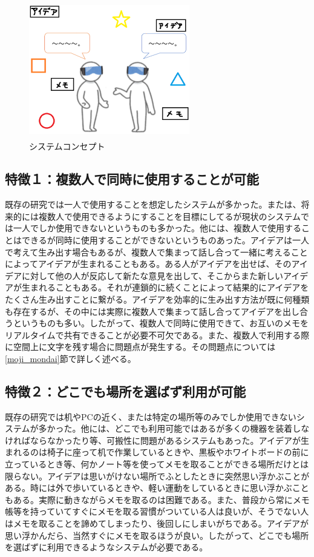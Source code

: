 \documentclass[technicalreport]{ieicej}
\begin{document}
\begin{figure}[h]
  \begin{center}
    \includegraphics[clip,height=6.0cm,width=7.0cm]{./concept.eps}
    \caption{システムコンセプト}
    \label{fig:concept}
  \end{center}
\end{figure}

\subsection*{特徴１：複数人で同時に使用することが可能}
既存の研究では一人で使用することを想定したシステムが多かった。または、将来的には複数人で使用できるようにすることを目標にしてるが現状のシステムでは一人でしか使用できないというものも多かった。他には、複数人で使用することはできるが同時に使用することができないというものあった。アイデアは一人で考えて生み出す場合もあるが、複数人で集まって話し合って一緒に考えることによってアイデアが生まれることもある。ある人がアイデアを出せば、そのアイデアに対して他の人が反応して新たな意見を出して、そこからまた新しいアイデアが生まれることもある。それが連鎖的に続くことによって結果的にアイデアをたくさん生み出すことに繋がる。アイデアを効率的に生み出す方法が既に何種類も存在するが、その中には実際に複数人で集まって話し合ってアイデアを出し合うというものも多い。したがって、複数人で同時に使用できて、お互いのメモをリアルタイムで共有できることが必要不可欠である。また、複数人で利用する際に空間上に文字を残す場合に問題点が発生する。その問題点については\ref{moji_mondai}節で詳しく述べる。

\subsection*{特徴２：どこでも場所を選ばず利用が可能}
既存の研究では机やPCの近く、または特定の場所等のみでしか使用できないシステムが多かった。他には、どこでも利用可能ではあるが多くの機器を装着しなければならなかったり等、可搬性に問題があるシステムもあった。アイデアが生まれるのは椅子に座って机で作業しているときや、黒板やホワイトボードの前に立っているとき等、何かノート等を使ってメモを取ることができる場所だけとは限らない。アイデアは思いがけない場所でふとしたときに突然思い浮かぶことがある。時には外で歩いているときや、軽い運動をしているときに思い浮かぶこともある。実際に動きながらメモを取るのは困難である。また、普段から常にメモ帳等を持っていてすぐにメモを取る習慣がついている人は良いが、そうでない人はメモを取ることを諦めてしまったり、後回しにしまいがちである。アイデアが思い浮かんだら、当然すぐにメモを取るほうが良い。したがって、どこでも場所を選ばずに利用できるようなシステムが必要である。
\end{document}
